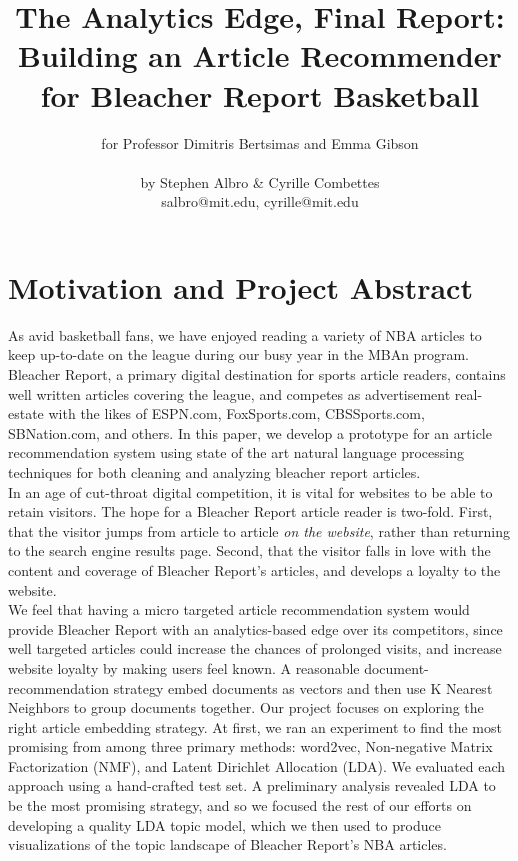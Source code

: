 \documentclass[11pt]{article}
\title{The Analytics Edge, Final Report:\\ Building an Article Recommender for Bleacher Report Basketball}
\author{for Professor Dimitris Bertsimas and Emma Gibson \text{ } \\ \\ by Stephen Albro \& Cyrille Combettes \\ salbro@mit.edu, cyrille@mit.edu}
\begin{document}
\maketitle{}


\section{Motivation and Project Abstract}
As avid basketball fans, we have enjoyed reading a variety of NBA articles to keep up-to-date on the league during our busy year in the MBAn program.  Bleacher Report, a primary digital destination for sports article readers, contains well written articles covering the league, and competes as advertisement real-estate with the likes of ESPN.com, FoxSports.com, CBSSports.com, SBNation.com, and others.  In this paper, we develop a prototype for an article recommendation system using state of the art natural language processing techniques for both cleaning and analyzing bleacher report articles.\\

  In an age of cut-throat digital competition, it is vital for websites to be able to retain visitors. The hope for a Bleacher Report article reader is two-fold. First, that the visitor jumps from article to article \textit{on the website}, rather than returning to the search engine results page.  Second, that the visitor falls in love with the content and coverage of Bleacher Report's articles, and develops a loyalty to the website. \\

We feel that having a micro targeted article recommendation system would provide Bleacher Report with an analytics-based edge over its competitors, since well targeted articles could increase the chances of prolonged visits, and increase website loyalty by making users feel known.   A reasonable document-recommendation strategy embed documents as vectors and then use K Nearest Neighbors to group documents together. Our project focuses on exploring the right article embedding strategy.  At first, we ran an experiment to find the most promising from among  three primary methods: word2vec, Non-negative Matrix Factorization (NMF), and Latent Dirichlet Allocation (LDA).  We evaluated each approach using a hand-crafted test set.  A preliminary analysis revealed LDA to be the most promising strategy, and so we focused the rest of our efforts on developing a quality LDA topic model, which we then used to produce visualizations of the topic landscape of Bleacher Report's NBA articles. 
\end{document}
